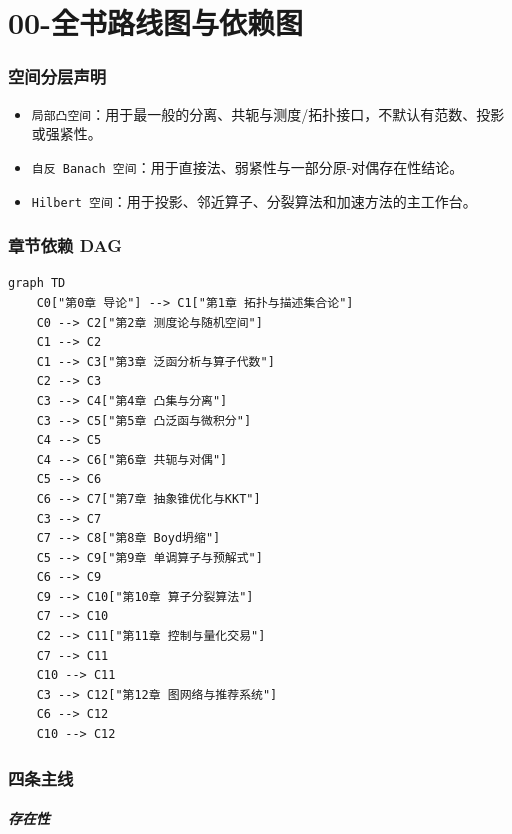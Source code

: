 \chapter*{00-全书路线图与依赖图}

\label{front:roadmap}


\subsection*{空间分层声明}

        \begin{itemize}
  \item \texttt{局部凸空间}：用于最一般的分离、共轭与测度/拓扑接口，不默认有范数、投影或强紧性。
  \item \texttt{自反 Banach 空间}：用于直接法、弱紧性与一部分原-对偶存在性结论。
  \item \texttt{Hilbert 空间}：用于投影、邻近算子、分裂算法和加速方法的主工作台。
\end{itemize}

\subsection*{章节依赖 DAG}

        \begin{verbatim}
graph TD
    C0["第0章 导论"] --> C1["第1章 拓扑与描述集合论"]
    C0 --> C2["第2章 测度论与随机空间"]
    C1 --> C2
    C1 --> C3["第3章 泛函分析与算子代数"]
    C2 --> C3
    C3 --> C4["第4章 凸集与分离"]
    C3 --> C5["第5章 凸泛函与微积分"]
    C4 --> C5
    C4 --> C6["第6章 共轭与对偶"]
    C5 --> C6
    C6 --> C7["第7章 抽象锥优化与KKT"]
    C3 --> C7
    C7 --> C8["第8章 Boyd坍缩"]
    C5 --> C9["第9章 单调算子与预解式"]
    C6 --> C9
    C9 --> C10["第10章 算子分裂算法"]
    C7 --> C10
    C2 --> C11["第11章 控制与量化交易"]
    C7 --> C11
    C10 --> C11
    C3 --> C12["第12章 图网络与推荐系统"]
    C6 --> C12
    C10 --> C12
\end{verbatim}

\subsection*{四条主线}

        \paragraph{存在性}

